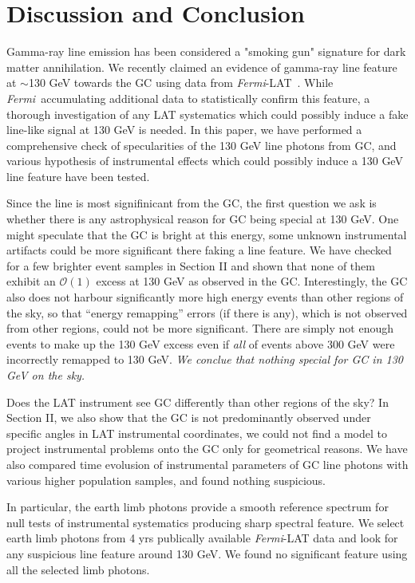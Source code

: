 \documentclass[aps,twocolumn,prd,superscriptaddress,showpacs,nofootinbib,fixfloat]{revtex4}
\newcommand{\Fermi}{{\slshape Fermi}}
\begin{document}
\section{Discussion and Conclusion}
\label{sec:Conclusion}

Gamma-ray line emission has been considered a "smoking gun"
signature for dark matter annihilation.  We recently claimed
an evidence of gamma-ray line feature at $\sim$130 GeV
towards the GC using data from
\Fermi-LAT~\citep{Weniger:2012,linepaper}. While
\Fermi\ accumulating additional data to statistically
confirm this feature, a thorough investigation of any LAT
systematics which could possibly induce a fake line-like
signal at 130 GeV is needed. In this paper, we have
performed a comprehensive check of specularities of the 130
GeV line photons from GC, and various hypothesis of
instrumental effects which could possibly induce a 130 GeV
line feature have been tested.


Since the line is most signifinicant from the GC, the first
question we ask is whether there is any astrophysical reason
for GC being special at 130 GeV.  One might speculate that
the GC is bright at this energy, some unknown instrumental
artifacts could be more significant there faking a line
feature. We have checked for a few brighter event samples in
Section II and shown that none of them exhibit an
$\mathcal{O}(1)$ excess at 130 GeV as observed in the
GC. Interestingly, the GC also does not harbour
significantly more high energy events than other regions of
the sky, so that ``energy remapping'' errors (if there is
any), which is not observed from other regions, could not be
more significant. There are simply not enough events to make
up the 130 GeV excess even if \emph{all} of events above 300
GeV were incorrectly remapped to 130 GeV. {\em We conclue
  that nothing special for GC in 130 GeV on the sky.}

Does the LAT instrument see GC differently than other
regions of the sky? In Section II, we also show that
the GC is not predominantly observed under specific angles
in LAT instrumental coordinates, we could not find a model
to project instrumental problems onto the GC only for
geometrical reasons. We have also compared time evolusion of
instrumental parameters of GC line photons with various
higher population samples, and found nothing suspicious.

In particular, the earth limb photons provide a smooth
reference spectrum for null tests of instrumental
systematics producing sharp spectral feature. We select
earth limb photons from 4 yrs publically available
\Fermi-LAT data and look for any suspicious line feature
around 130 GeV.  We found no significant feature using all
the selected limb photons.
\end{document}
